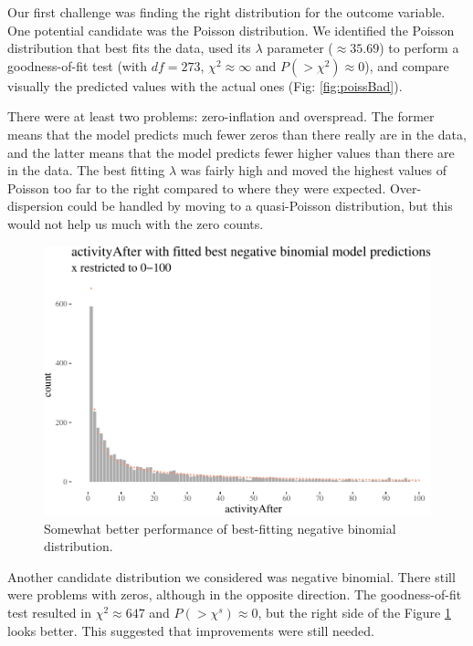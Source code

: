 \documentclass[a4paper,fleqn]{cas-dc}
\begin{document}
Our first challenge was finding the right distribution for the outcome
variable. One potential candidate was the Poisson distribution. We
identified the Poisson distribution that best fits the data, used its
\(\lambda\) parameter (\(\approx 35.69\)) to perform a goodness-of-fit
test (with \(df=273\), \(\chi^2 \approx \infty\) and
\(P(>\chi^2)\approx 0\)), and compare visually the predicted values with
the actual ones (Fig: \ref{fig:poissBad}).

There were at least two problems: zero-inflation and overspread. The
former means that the model predicts much fewer zeros than there really
are in the data, and the latter means that the model predicts fewer
higher values than there are in the data. The best fitting \(\lambda\)
was fairly high and moved the highest values of Poisson too far to the
right compared to where they were expected. Over-dispersion could be
handled by moving to a quasi-Poisson distribution, but this would not
help us much with the zero counts.




\begin{figure}
\begin{center}\includegraphics[width=1\linewidth]{images/unnamed-chunk-34-1} \end{center}
\caption{Somewhat better performance of best-fitting negative binomial distribution.}
\label{fig:nbinperf}
\end{figure}

Another candidate distribution we considered was negative binomial.
There still were problems with zeros, although in the opposite direction. The goodness-of-fit test resulted in \(\chi^2 \approx 647\) and
\(P(>\chi^s)\approx 0\), but the right side of the Figure
\ref{fig:nbinperf} looks better. This suggested that improvements were
still needed.
\end{document}
